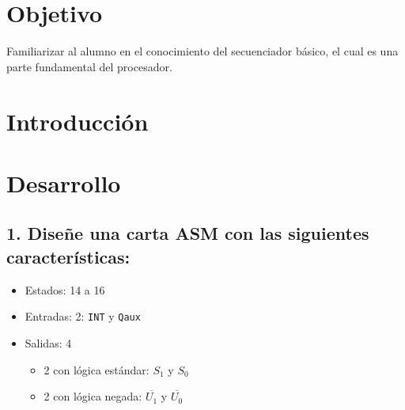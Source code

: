 \documentclass[12pt, letterpaper]{article}
\begin{document}


\section*{Objetivo}

Familiarizar al alumno en el conocimiento del secuenciador básico, el cual es una parte
fundamental del procesador.

\section*{Introducción}



\section*{Desarrollo}

\subsection*{1. Diseñe una carta ASM con las siguientes características:}

\begin{itemize}
    \item Estados: 14 a 16
    \item Entradas: 2: \texttt{INT} y \texttt{Qaux}
    \item Salidas: 4
    \begin{itemize}
        \item 2 con lógica estándar: $S_1$ y $S_0$
        \item 2 con lógica negada: $\overline{U_1}$ y $\overline{U_0}$
    \end{itemize}
\end{itemize}
\end{document}
